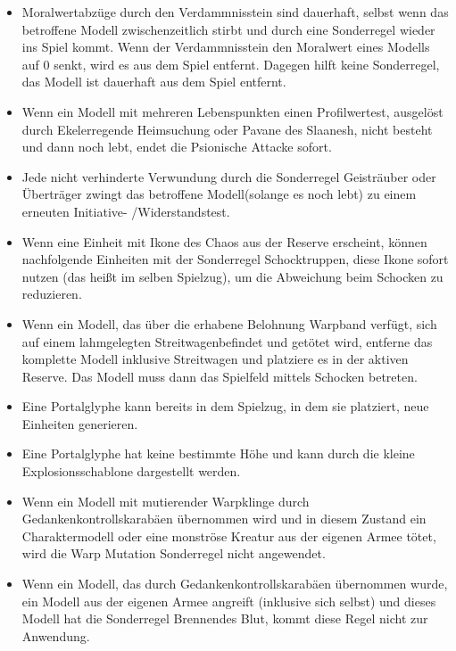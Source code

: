 \begin{itemize}
 \item
Moralwertabzüge durch den Verdammnisstein sind dauerhaft, selbst wenn das
betroffene Modell zwischenzeitlich stirbt und durch eine Sonderregel wieder ins
Spiel kommt. Wenn der Verdammnisstein den Moralwert eines Modells auf 0 senkt,
wird es aus dem Spiel entfernt. Dagegen hilft keine Sonderregel, das Modell ist
dauerhaft aus dem Spiel entfernt.

 \item Wenn ein Modell mit mehreren Lebenspunkten einen Profilwertest, ausgelöst
  durch Ekelerregende Heimsuchung oder Pavane des Slaanesh, nicht besteht und
  dann noch lebt, endet die Psionische Attacke sofort.

 \item Jede nicht verhinderte Verwundung durch die Sonderregel Geisträuber oder
  Überträger zwingt das betroffene Modell(solange es noch lebt) zu einem
  erneuten Initiative- /Widerstandstest.

 \item Wenn eine Einheit mit Ikone des Chaos aus der Reserve erscheint, können
  nachfolgende Einheiten mit der Sonderregel Schocktruppen, diese Ikone sofort
  nutzen (das heißt im selben Spielzug), um die Abweichung beim Schocken zu
  reduzieren.

 \item Wenn ein Modell, das über die erhabene Belohnung Warpband verfügt, sich
  auf einem lahmgelegten Streitwagenbefindet und getötet wird, entferne das
  komplette Modell inklusive Streitwagen und platziere es in der aktiven
  Reserve. Das Modell muss dann das Spielfeld mittels Schocken betreten.

 \item Eine Portalglyphe kann bereits in dem Spielzug, in dem sie platziert,
  neue Einheiten generieren.

 \item Eine Portalglyphe hat keine bestimmte Höhe und kann durch die kleine
  Explosionsschablone dargestellt werden.

 \item Wenn ein Modell mit mutierender Warpklinge durch
  Gedankenkontrollskarabäen übernommen wird und in diesem Zustand ein
  Charaktermodell oder eine monströse Kreatur aus der eigenen Armee tötet, wird
  die Warp Mutation Sonderregel nicht angewendet.

 \item Wenn ein Modell, das durch Gedankenkontrollskarabäen übernommen wurde,
  ein Modell aus der eigenen Armee angreift (inklusive sich selbst) und dieses
  Modell hat die Sonderregel Brennendes Blut, kommt diese Regel nicht zur
  Anwendung.


\end{itemize}
